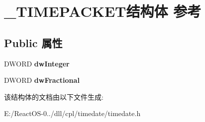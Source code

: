 \hypertarget{struct___t_i_m_e_p_a_c_k_e_t}{}\section{\+\_\+\+T\+I\+M\+E\+P\+A\+C\+K\+E\+T结构体 参考}
\label{struct___t_i_m_e_p_a_c_k_e_t}
\subsection*{Public 属性}
\begin{DoxyCompactItemize}
\item 
\mbox{\label{struct___t_i_m_e_p_a_c_k_e_t_a94dcc6a41b965372d3d82e3bf11fc963}} 
D\+W\+O\+RD {\bfseries dw\+Integer}
\item 
\mbox{\label{struct___t_i_m_e_p_a_c_k_e_t_afe2c3cbb45559389e7cf9a4ac31a8650}} 
D\+W\+O\+RD {\bfseries dw\+Fractional}
\end{DoxyCompactItemize}


该结构体的文档由以下文件生成\+:\begin{DoxyCompactItemize}
\item 
E\+:/\+React\+O\+S-\/0../dll/cpl/timedate/timedate.\+h\end{DoxyCompactItemize}

